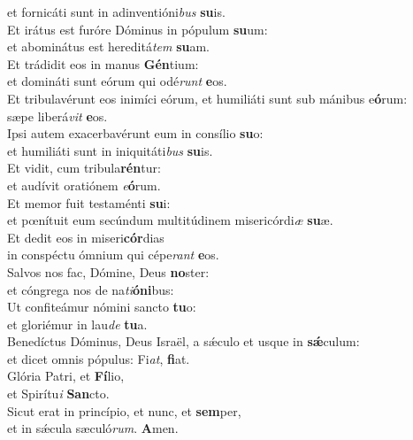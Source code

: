 \oddverse et fornicáti sunt in adinventióni\textit{bus} \textbf{su}is.\\
\evenverse Et irátus est furóre Dóminus in pópulum \textbf{su}um:~\*\\
\evenverse et abominátus est hereditá\textit{tem} \textbf{su}am.\\
\oddverse Et trádidit eos in manus \textbf{Gén}tium:~\*\\
\oddverse et domináti sunt eórum qui odé\textit{runt} \textbf{e}os.\\
\evenverse Et tribulavérunt eos inimíci eórum, et humiliáti sunt sub mánibus e\textbf{ó}rum:~\*\\
\evenverse sæpe liberá\textit{vit} \textbf{e}os.\\
\oddverse Ipsi autem exacerbavérunt eum in consílio \textbf{su}o:~\*\\
\oddverse et humiliáti sunt in iniquitáti\textit{bus} \textbf{su}is.\\
\evenverse Et vidit, cum tribula\textbf{rén}tur:~\*\\
\evenverse et audívit oratiónem \textit{e}\textbf{ó}rum.\\
\oddverse Et memor fuit testaménti \textbf{su}i:~\*\\
\oddverse et pœnítuit eum secúndum multitúdinem misericórdi\textit{æ} \textbf{su}æ.\\
\evenverse Et dedit eos in miseri\textbf{cór}dias~\*\\
\evenverse in conspéctu ómnium qui cépe\textit{rant} \textbf{e}os.\\
\oddverse Salvos nos fac, Dómine, Deus \textbf{no}ster:~\*\\
\oddverse et cóngrega nos de na\textit{ti}\textbf{ó}\textbf{ni}bus:\\
\evenverse Ut confiteámur nómini sancto \textbf{tu}o:~\*\\
\evenverse et gloriémur in lau\textit{de} \textbf{tu}a.\\
\oddverse Benedíctus Dóminus, Deus Israël, a sǽculo et usque in \textbf{sǽ}culum:~\*\\
\oddverse et dicet omnis pópulus: Fi\textit{at}, \textbf{fi}at.\\
\evenverse Glória Patri, et \textbf{Fí}lio,~\*\\
\evenverse et Spirítu\textit{i} \textbf{San}cto.\\
\oddverse Sicut erat in princípio, et nunc, et \textbf{sem}per,~\*\\
\oddverse et in sǽcula sæculó\textit{rum}. \textbf{A}men.\\
